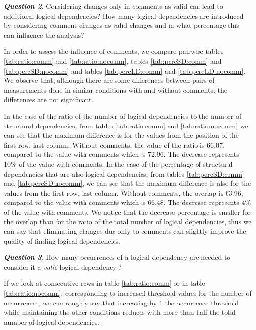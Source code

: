 \documentclass[a4paper,twoside]{article}
\begin{document}
\textit{\textbf{Question 2}}. Considering changes only in comments as valid can lead to additional logical dependencies? How many logical dependencies are introduced by considering comment changes as valid changes and in what percentage this can influence the analysis?

In order to assess the influence of comments, we compare pairwise tables \ref{tab:ratio:comm} and \ref{tab:ratio:nocomm},  
tables \ref{tab:percSD:comm} and \ref{tab:percSD:nocomm} and tables \ref{tab:percLD:comm} and \ref{tab:percLD:nocomm}. 
We observe that, although there are some differences between pairs of measurements done in similar conditions with and without comments, the differences are not significant.

In the case of the ratio of the number of logical dependencies to the number of structural dependencies, from tables \ref{tab:ratio:comm} and \ref{tab:ratio:nocomm} we can see that the maximum difference is for the values from the position of the first row, last column. Without comments, the value of the ratio is 66.07, compared to the value with comments which is 72.96. The decrease represents 10\% of the value with comments. In the case of the percentage of structural dependencies that are also logical dependencies, from tables \ref{tab:percSD:comm} and \ref{tab:percSD:nocomm}, we can see that the maximum difference is also for the values from the first row, last column. Without comments, the overlap is 63.96, compared to the value with comments which is 66.48.  The decrease represents 4\% of the value with comments. We notice that the decrease percentage is smaller for the overlap than for the ratio of the total number of logical dependencies, thus we can say that eliminating changes due only to comments can slightly improve the quality of finding logical dependencies. 



\textit{\textbf{Question 3}}. How many occurrences of a logical dependency are needed to consider it a \textit{valid} logical dependency ? 

If we look at consecutive rows in table \ref{tab:ratio:comm} or in table \ref{tab:ratio:nocomm}, corresponding to increased threshold values for the number of occurrences, we can roughly say that  increasing by 1 the occurrence threshold while maintaining the other conditions reduces with more than half the total number of logical dependencies.  
\end{document}
